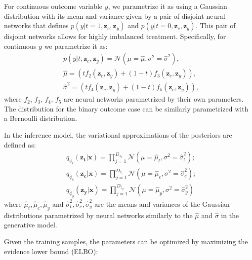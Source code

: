 \documentclass[letterpaper]{article} %
\begin{document}
For continuous outcome variable $y$, we parametrize it as using a Gaussian distribution with its mean and variance given by a pair of disjoint neural networks that defines $p(y|t=1,\mathbf{z}_c, \mathbf{z}_y)$ and $p(y|t=0,\mathbf{z}_c, \mathbf{z}_y)$. This pair of disjoint networks allows for highly imbalanced treatment. Specifically, for continuous $y$ we parametrize it as:
\begin{align}
&p(y|t, \mathbf{z}_c, \mathbf{z}_y)  = \mathcal{N}(\mu =\hat{\mu}, \sigma^2 = \hat{\sigma}^2),\nonumber\\
&\hat{\mu} = (tf_2(\mathbf{z}_c, \mathbf{z}_y) + (1-t)f_3(\mathbf{z}_c, \mathbf{z}_y)), \nonumber\\
&\hat{\sigma}^2 = (tf_4(\mathbf{z}_c, \mathbf{z}_y) + (1-t)f_5(\mathbf{z}_c, \mathbf{z}_y)),
\end{align}
where $f_2$, $f_3$, $f_4$, $f_5$ are neural networks parametrized by their own parameters.
The distribution for the binary outcome case can be similarly parametrized with a Bernoulli distribution.

In the inference model, the variational approximations of the posteriors are defined as:
\begin{align}
&q_{\phi_{t}}(\mathbf{z_t}|\mathbf{x}) = \prod\limits_{j=1}^{D_{z_t}} \mathcal{N}(\mu = \hat{\mu}_{t}, \sigma^2 = \hat{\sigma}_t^2 );\nonumber\\
&q_{\phi_{c}}(\mathbf{z_c}|\mathbf{x}) = \prod\limits_{j=1}^{D_{z_c}} \mathcal{N} (\mu = \hat{\mu}_{c}, \sigma^2 = \hat{\sigma}_c^2 );\nonumber\\
&q_{\phi_{y}}(\mathbf{z_y}|\mathbf{x}) = \prod\limits_{j=1}^{D_{z_y}} \mathcal{N} (\mu = \hat{\mu}_{y}, \sigma^2 = \hat{\sigma}_y^2 )
\end{align}
where $\hat{\mu}_t, \hat{\mu}_c, \hat{\mu}_y$ and $ \hat{\sigma}_t^2,  \hat{\sigma}_c^2,  \hat{\sigma}_y^2$ are the means and variances of the Gaussian distributions parametrized by neural networks similarly to the $\hat{\mu}$ and $\hat{\sigma}$ in the generative model.

Given the training samples, the parameters can be optimized by maximizing the evidence lower bound (ELBO):
\end{document}
